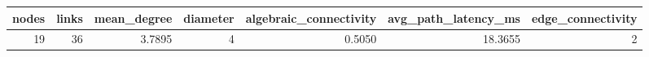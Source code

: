 \begin{tabular}{rrrrrrr}
\toprule
nodes & links & mean\_degree & diameter & algebraic\_connectivity & avg\_path\_latency\_ms & edge\_connectivity \\
\midrule
19 & 36 & 3.7895 & 4 & 0.5050 & 18.3655 & 2 \\
\bottomrule
\end{tabular}
